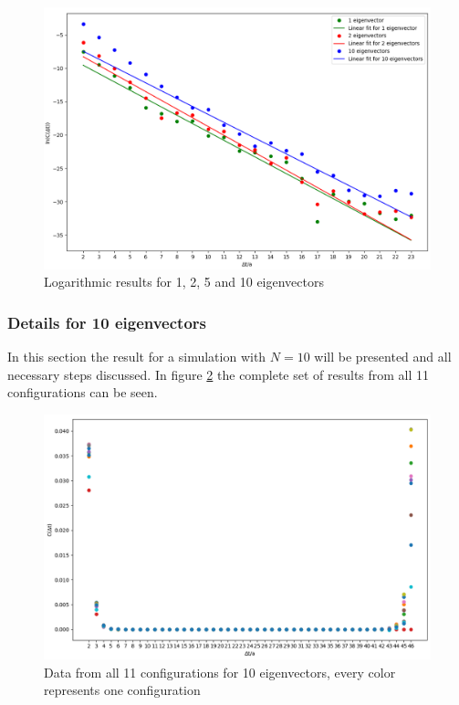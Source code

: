     \begin{figure}[H]
        \centering
        \includegraphics[width=1\textwidth]{images/1_2_10_log.png}
        \caption{Logarithmic results for 1, 2, 5 and 10 eigenvectors}
        \label{1_2_5_10_evs_log}
    \end{figure}
    
    \subsubsection{Details for 10 eigenvectors}
    In this section the result for a simulation with $N = 10$ will be presented and all necessary steps discussed. In figure \ref{10_evs_full} the complete set of results from all 11 configurations can be seen.

    \begin{figure}[H]
        \centering
        \includegraphics[width=1\textwidth]{images/10_ev_full.png} %
        \caption{Data from all 11 configurations for 10 eigenvectors, every color represents one configuration}
        \label{10_evs_full}
    \end{figure}
    
